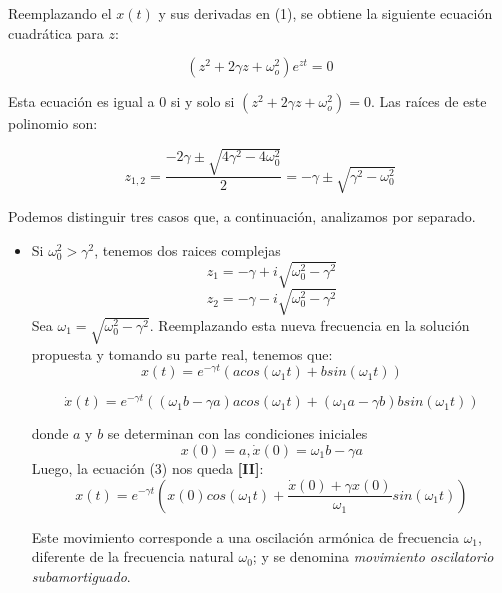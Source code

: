 \documentclass[a4paper,12pt]{article}
\begin{document}
Reemplazando el $x(t)$ y sus derivadas en (1), se obtiene la siguiente ecuaci\'on cuadr\'atica para $z$:

$$
(z^2 + 2\gamma z + \omega_o^2)e^{zt}=0
$$

Esta ecuaci\'on es igual a 0 si y solo si $(z^2 + 2\gamma z + \omega_o^2) = 0$. Las ra\'ices de este polinomio son:

$$
z_{1,2} = \frac{-2\gamma \pm \sqrt{4\gamma^2 - 4\omega_0^2}}{2} = -\gamma \pm \sqrt{\gamma^2 - \omega_0^2}
$$

Podemos distinguir tres casos que, a continuaci\'on, analizamos por separado.

\begin{itemize}
\item Si $\omega_0^2 > \gamma^2$, tenemos dos raices complejas
$$z_{1} = -\gamma + i\sqrt{\omega_0^2 - \gamma^2}$$  $$z_{2} = -\gamma - i\sqrt{\omega_0^2 - \gamma^2}$$
Sea $\omega_{1} = \sqrt{\omega_0^2 - \gamma^2}$. Reemplazando esta nueva frecuencia en la soluci\'on propuesta y tomando su parte real, tenemos que:
\begin{equation}
x(t) = e^{-\gamma t}(acos(\omega_{1}t) + bsin(\omega_{1}t))
\end{equation}

$$\dot{x}(t) = e^{-\gamma t}((\omega_{1}b - \gamma a)acos(\omega_{1}t) + (\omega_{1}a - \gamma b)bsin(\omega_{1}t))$$

donde $a$ y $b$ se determinan con las condiciones iniciales
$$ x(0) = a, \dot{x}(0) = \omega_{1}b - \gamma a$$
Luego, la ecuaci\'on (3) nos queda \textbf{[II]}:
\begin{equation}
x(t) = e^{-\gamma t}(x(0)cos(\omega_{1}t) + \frac{\dot{x}(0) + \gamma x(0)}{\omega_{1}}sin(\omega_{1}t))
\end{equation}

Este movimiento corresponde a una oscilaci\'on arm\'onica de frecuencia $\omega_{1}$, diferente de la frecuencia natural $\omega_{0}$; y se denomina \textit{movimiento oscilatorio subamortiguado}.


\end{itemize}
\end{document}
